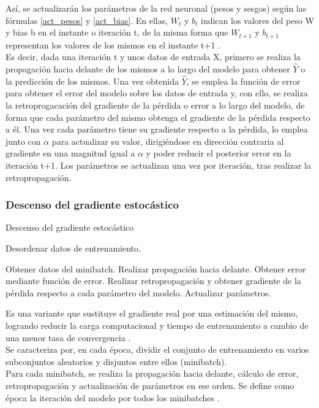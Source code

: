 Así, se actualizarán los parámetros de la red neuronal (pesos y sesgos) según las fórmulas \ref{act_pesos} y \ref{act_bias}. En ellas, $W_t$ y $b_t$ indican los valores del peso W y bias b en el instante o iteración t, de la misma forma que $W_{t+1}$ y $b_{t+1}$ representan los valores de los mismos en el instante t+1 \cite{SGD_act_params}. \\
Es decir, dada una iteración t y unos datos de entrada X, primero se realiza la propagación hacia delante de los mismos a lo largo del modelo para obtener  $\hat{Y}$ o la predicción de los mismos. Una vez obtenida $\hat{Y}$, se emplea la función de error para obtener el error del modelo sobre los datos de entrada y, con ello, se realiza la retroprogacación del gradiente de la pérdida o error a lo largo del modelo, de forma que cada parámetro del mismo obtenga el gradiente de la pérdida respecto a él. Una vez cada parámetro tiene su gradiente respecto a la pérdida, lo emplea junto con $\alpha$ para actualizar su valor, dirigiéndose en dirección contraria al gradiente en una magnitud igual a $\alpha$ y poder reducir el posterior error en la iteración t+1. Los parámetros se actualizan una vez por iteración, tras realizar la retropropagación.

\subsubsection{Descenso del gradiente estocástico}

\begin{algorithm}[H]
	\caption{Descenso del gradiente estocástico \cite{SGD_3}} 
	\begin{algorithmic}
			\State Desordenar datos de entrenamiento.
			
				\State Obtener datos del minibatch.
				\State Realizar propagación hacia delante.
				\State Obtener error mediante función de error.
				\State Realizar retropropagación y obtener gradiente de la pérdida   
				\State       respecto a cada parámetro del modelo.
				\State Actualizar parámetros.
			\EndFor
		\EndFor
	\end{algorithmic}
\end{algorithm}

Es una variante que sustituye el gradiente real por una estimación del mismo, logrando reducir la carga computacional y tiempo de entrenamiento a cambio de una menor tasa de convergencia \cite{sgd_stocastico} \cite{sgd_stocastico_1}. \\
Se caracteriza por, en cada época, dividir el conjunto de entrenamiento en varios subconjuntos aleatorios y disjuntos entre ellos (minibatch). \\
Para cada minibatch, se realiza la propagación hacia delante, cálculo de error, retropropagación y actualización de parámetros en ese orden. Se define como época la iteración del modelo por todos los minibatches \cite{sgd_stocastico}. \\

